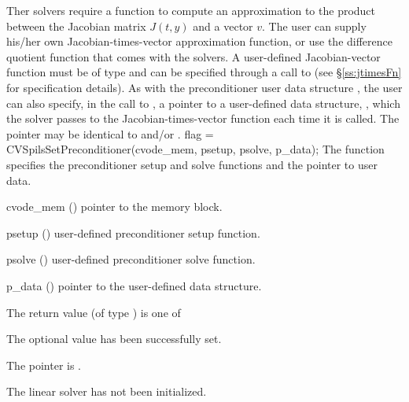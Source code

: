 Ther {\cvspils} solvers require a function to compute an approximation to the
product between the Jacobian matrix $J(t,y)$ and a vector $v$.
The user can supply his/her own Jacobian-times-vector approximation function, 
or use the difference quotient function  
that comes with the {\cvspils} solvers.  A user-defined Jacobian-vector
function must be of type  and 
can be specified through a call to  
(see \S\ref{ss:jtimesFn} for specification details).
As with the preconditioner user data structure , 
the user can also specify, in the call to , a
pointer to a user-defined data structure, , which
the {\cvspils} solver passes to the Jacobian-times-vector function 
each time it is called.  
The pointer  may be identical to  and/or .
{
  flag = CVSpilsSetPreconditioner(cvode\_mem, psetup, psolve, p\_data);
}
{
  The function  specifies the preconditioner
  setup and solve functions and the pointer to user data.
}
{
  \begin{args}
  \item[cvode\_mem] ()
    pointer to the {\cvode} memory block.
  \item[psetup] ()
    user-defined preconditioner setup function.
  \item[psolve] ()
    user-defined preconditioner solve function.
  \item[p\_data] ()
     pointer to the user-defined data structure.
  \end{args}
}
{
  The return value  (of type ) is one of
  \begin{args}
  \item[\Id{CVSPILS\_SUCCESS}] 
    The optional value has been successfully set.
  \item[\Id{CVSPILS\_MEM\_NULL}]
    The  pointer is .
  \item[\Id{CVSPILS\_LMEM\_NULL}]
    The {\cvspils} linear solver has not been initialized.
  \end{args}
}
